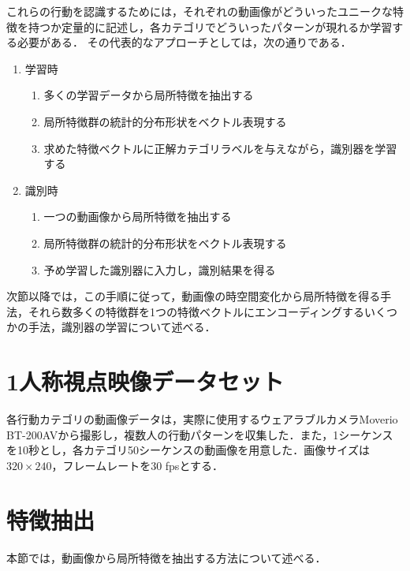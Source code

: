 これらの行動を認識するためには，それぞれの動画像がどういったユニークな特徴を持つか定量的に記述し，各カテゴリでどういったパターンが現れるか学習する必要がある．
その代表的なアプローチとしては，次の通りである．
%
\begin{enumerate}
\setlength{\itemsep}{-5pt}
\item{学習時}
  \begin{enumerate}
  \setlength{\itemsep}{-5pt}
  \item{多くの学習データから局所特徴を抽出する}
  \item{局所特徴群の統計的分布形状をベクトル表現する}
  \item{求めた特徴ベクトルに正解カテゴリラベルを与えながら，識別器を学習する}
  \end{enumerate}
\item{識別時}
  \begin{enumerate}
  \setlength{\itemsep}{-5pt}
  \item{一つの動画像から局所特徴を抽出する}
  \item{局所特徴群の統計的分布形状をベクトル表現する}
  \item{予め学習した識別器に入力し，識別結果を得る}
  \end{enumerate}
\end{enumerate}

次節以降では，この手順に従って，動画像の時空間変化から局所特徴を得る手法，それら数多くの特徴群を1つの特徴ベクトルにエンコーディングするいくつかの手法，識別器の学習について述べる．

\section{1人称視点映像データセット}
各行動カテゴリの動画像データは，実際に使用するウェアラブルカメラMoverio BT-200AVから撮影し，複数人の行動パターンを収集した．また，1シーケンスを10秒とし，各カテゴリ50シーケンスの動画像を用意した．画像サイズは$ 320\times240 $，フレームレートを30 fpsとする．

\section{特徴抽出}
本節では，動画像から局所特徴を抽出する方法について述べる．
